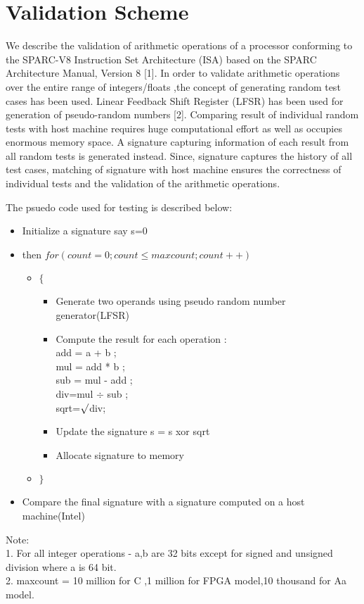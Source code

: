 \documentclass[12pt]{article}
\begin{document}
\section*{Validation Scheme}
We describe the validation of arithmetic operations of a processor conforming to the SPARC-V8 Instruction Set Architecture (ISA) based on the SPARC Architecture Manual, Version 8 [1]. 
In order to validate arithmetic operations over the entire range of integers/floats ,the concept of generating random test cases has been used. 
Linear Feedback Shift Register (LFSR) has been used for generation of pseudo-random numbers [2]. Comparing result of individual random tests with host machine requires huge computational effort as 
well as occupies enormous memory space. A signature capturing information of each result from all random tests is generated instead. Since, signature captures the history of all test cases, matching
of signature with host machine ensures the correctness of individual tests and the validation of the arithmetic operations.\par
\noindent
The psuedo code used for testing is described below:
\begin{itemize}
  \item Initialize a signature say s=0
  \item then $for(count=0;count \le maxcount;count++)$
		\begin{itemize}
		\item[] $\{$
		\begin{itemize}
		\item Generate two operands using pseudo random number generator(LFSR)
		\item Compute the result for each operation :\\
			add = a + b ;\\
			mul = add * b ;\\
			sub = mul - add ;\\
			div=mul $\div$ sub ;\\
			sqrt=$\surd$div;\\
		\item Update the signature s = s xor sqrt
		\item Allocate signature to memory
		\end{itemize}
		\item[] $\}$
		\end{itemize}
\item Compare the final signature with a signature computed on a host machine(Intel)			
\end{itemize}
Note:\\
1. For all integer operations - a,b are 32 bits except for signed and unsigned division where a is 64 bit.\\
2. maxcount = 10 million for C ,1 million for FPGA model,10 thousand for Aa model.
\end{document}
